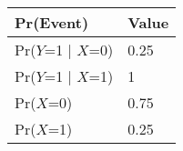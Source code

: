 \begin{tabular}{|l|l|}\hline
	Pr(Event)	&Value \\ \hline
	Pr($Y$=1 | $X$=0) &0.25 \\ \hline
	Pr($Y$=1 | $X$=1) &1  \\ \hline
	Pr($X$=0) &0.75 \\ \hline
	Pr($X$=1)	&0.25 \\ \hline
	
\end{tabular}